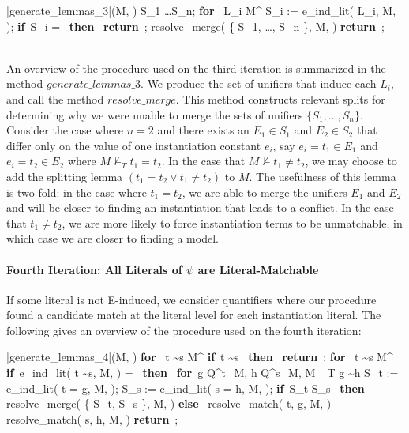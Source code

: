 \documentclass{llncs}
\def\IF{\qtab\keyword{if}\ }
\def\THEN{\ \keyword{then}\ }
\def\ELSE{\untab\qtab\keyword{else}\ }
\def\FI{\untab}
\def\RETURN{\keyword{return}\ }
\def\ENDPROC{\untab}
\def\DOFOR{\qtab\keyword{for}\ }
\def\ENDFOR{\untab}
\def\keyword#1{\mbox{\normalshape\bf #1}}
\begin{document}
\begin{minipage}[t]{.4\linewidth}
\begin{program}
\PROC |generate\_lemmas\_3|(M, \psi) \BODY
  S_1 \ldots S_n;
  \DOFOR {} L_i \in M^\psi
    S_i := e\_ind\_lit( L_i, M, \psi );
    \IF S_i = \emptyset \THEN
      \RETURN;
    \FI
  \ENDFOR
  resolve\_merge( \{ S_1, \ldots, S_n \}, M, \psi )
  \RETURN;
\ENDPROC
\end{program}
\end{minipage}

\ \\

An overview of the procedure used on the third iteration is summarized in the method $generate\_lemmas\_3$.
We produce the set of unifiers that induce each $L_i$, and call the method $resolve\_merge$.
This method constructs relevant splits for determining why we were unable to merge the sets of unifiers $\{ S_1, \ldots, S_n \}$.
Consider the case where $n = 2$ and there exists an $E_1 \in S_1$ and $E_2 \in S_2$ that differ only on the value of one instantiation constant $e_i$, say $e_i = t_1 \in E_1$ and $e_i = t_2 \in E_2$ where $M \not\models_T t_1 = t_2$.
In the case that $M \not\models t_1 \neq t_2$, we may choose to add the splitting lemma $( t_1 = t_2 \vee t_1 \neq t_2 )$ to $M$.
The usefulness of this lemma is two-fold: in the case where $t_1 = t_2$, we are able to merge the unifiers $E_1$ and $E_2$ and will be closer to finding an instantiation that leads to a conflict.
In the case that $t_1 \neq t_2$, we are more likely to force instantiation terms to be unmatchable, in which case we are closer to finding a model.

\paragraph{Fourth Iteration: All Literals of $\psi$ are Literal-Matchable}

If some literal is not E-induced, we consider quantifiers where our procedure found a candidate match at the literal level for each instantiation literal.
The following gives an overview of the procedure used on the fourth iteration:

\begin{minipage}[t]{.4\linewidth}
\begin{program}
\PROC |generate\_lemmas\_4|(M, \psi) \BODY
  \DOFOR {} t \sim s \in M^\psi
    \IF t \sim s  \THEN
      \RETURN;
    \FI
  \ENDFOR
  \DOFOR {} t \sim s \in M^\psi
    \IF e\_ind\_lit( t \sim s, M, \psi ) = \emptyset \THEN
      \DOFOR g \in Q^t_M, h \in Q^s_M,  M \models_T g \sim h
      	S_t := e\_ind\_lit( t = g, M, \psi );
      	S_s := e\_ind\_lit( s = h, M, \psi );
        \IF S_t \neq \emptyset {} S_s \neq \emptyset \THEN
      	  resolve\_merge( \{ S_t, S_s \}, M, \psi )
      	\ELSE	
      	  resolve\_match( t, g, M, \psi )
     	  resolve\_match( s, h, M, \psi )
     	\FI
      \ENDFOR
    \FI
  \ENDFOR
  \RETURN;
\ENDPROC
\end{program}
\end{minipage}
\end{document}
